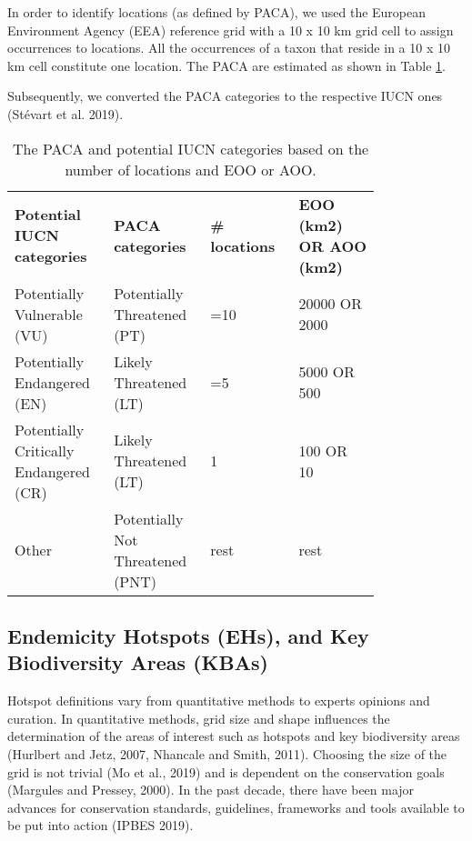 In order to identify locations (as defined by PACA), we used the European
Environment Agency (EEA) reference grid with a 10 x 10 km grid cell to assign
occurrences to locations. All the occurrences of a taxon that reside in a
10 x 10 km cell constitute one location. The PACA are estimated as shown in Table \ref{table:arthropods-paca}.

Subsequently, we converted the PACA categories to the respective IUCN ones (Stévart et al. 2019).

\begin{table}
\centering
\caption{The PACA and potential IUCN categories based on the number of locations and EOO or AOO.}
\begin{tabular}{p{0.2\linewidth} | p{0.2\linewidth} | p{0.2\linewidth} | p{0.2\linewidth}}
\textbf{Potential IUCN categories}     & \textbf{PACA categories}         & \textbf{\# locations} & \textbf{EOO (km2) OR AOO (km2)}  \\
Potentially Vulnerable (VU)            & Potentially Threatened (PT)      & =10                   & 20000 OR 2000                    \\
Potentially Endangered (EN)            & Likely Threatened (LT)           & =5                    & 5000 OR 500                      \\
Potentially Critically Endangered (CR) & Likely Threatened (LT)           & 1                     & 100 OR 10                        \\
Other                                  & Potentially Not Threatened (PNT) & rest                  & rest                            
\end{tabular}
\label{table:arthropods-paca}
\end{table}
    
    \subsection{Endemicity Hotspots (EHs), and Key Biodiversity Areas (KBAs)}
    \label{subsec:arthropods-ehs-kbas}

Hotspot definitions vary from quantitative methods to experts opinions and curation.
In quantitative methods, grid size and shape influences the determination of
the areas of interest such as hotspots and key biodiversity areas (Hurlbert and Jetz, 2007, Nhancale and Smith, 2011).
Choosing the size of the grid is not trivial (Mo et al., 2019) and is dependent
on the conservation goals (Margules and Pressey, 2000). In the past decade,
there have been major advances for conservation standards, guidelines,
frameworks and tools available to be put into action (IPBES 2019).

